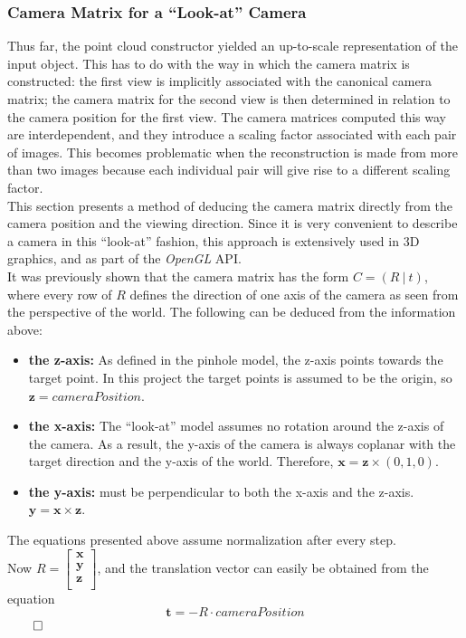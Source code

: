\documentclass[12pt,a4paper,twoside,openright]{report}
\begin{document}
\subsubsection{Camera Matrix for a \enquote{Look-at} Camera}
Thus far, the point cloud constructor yielded an up-to-scale representation of the input object. This has to do with the way in which the camera matrix is constructed: the first view is implicitly associated with the canonical camera matrix; the camera matrix for the second view is then determined in relation to the camera position for the first view. The camera matrices computed this way are interdependent, and they introduce a scaling factor associated with each pair of images. This becomes problematic when the reconstruction is made from more than two images because each individual pair will give rise to a different scaling factor. \\
This section presents a method of deducing the camera matrix directly from the camera position and the viewing direction. Since it is very convenient to describe a camera in this \enquote{look-at} fashion, this approach is extensively used in 3D graphics, and as part of the \emph{OpenGL} API.\\
\linebreak
It was previously shown that the camera matrix has the form $C = (R\ |\ t)$, where every row of $R$ defines the direction of one axis of the camera as seen from the perspective of the world. The following can be deduced from the information above:
\begin{itemize}
\item \textbf{the z-axis:} As defined in the pinhole model, the z-axis points towards the target point. In this project the target points is assumed to be the origin, so $\mathbf{z} = cameraPosition$. 
\item \textbf{the x-axis:} The \enquote{look-at} model assumes no rotation around the z-axis of the camera. As a result, the y-axis of the camera is always coplanar with the target direction and the y-axis of the world. Therefore, $\mathbf{x} = \mathbf{z} \times (0, 1, 0)$.
\item \textbf{the y-axis:} must be perpendicular to both the x-axis and the z-axis. $\mathbf{y} = \mathbf{x} \times \mathbf{z}$.
\end{itemize}
The equations presented above assume normalization after every step.\\
\linebreak
Now $R = \begin{bmatrix}
\mathbf{x} \\
\mathbf{y} \\
\mathbf{z} \\
\end{bmatrix}$, and the translation vector can easily be obtained from the equation
\begin{equation}
\mathbf{t} = -R \cdot cameraPosition
\end{equation}
$\qedhere$
\end{document}
